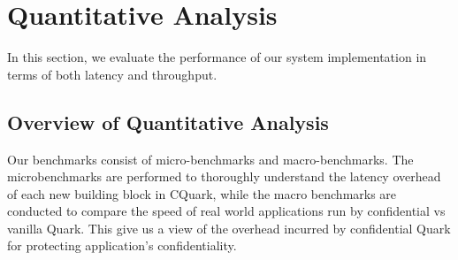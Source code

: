 







\section{Quantitative Analysis}
In this section, we evaluate the performance of our system implementation in terms of both latency and throughput.

\subsection{Overview of Quantitative Analysis}
Our benchmarks  consist of micro-benchmarks and macro-benchmarks. The microbenchmarks are performed to  thoroughly understand the latency overhead of each new building block in CQuark, while the macro benchmarks are conducted to compare the speed of 
real world applications run by confidential vs vanilla Quark. This give us a view of the overhead incurred by confidential Quark for protecting application’s confidentiality.


